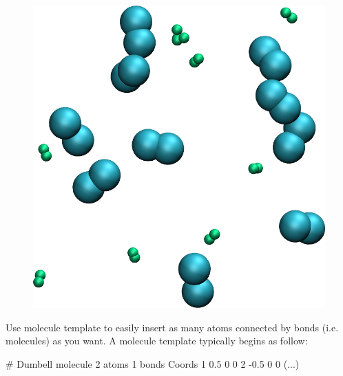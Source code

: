 \begin{figure}[h!]
\includegraphics[width=\linewidth]{tutorials/level0/lennard-jones-fluid/dumbell-light.png}
\end{figure}

\begin{tcolorbox}[colback=mylightblue!5!white,colframe=mylightblue!75!black,title=Hints]
Use molecule template to easily insert as many atoms connected
by bonds (i.e. molecules) as you want. A molecule 
template typically begins as follow:
\begin{lcverbatim}
# Dumbell molecule
2 atoms
1 bonds
Coords
1 0.5 0 0
2 -0.5 0 0
(...)
\end{lcverbatim}

\noindent \end{tcolorbox}

